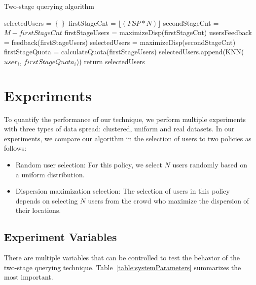 \documentclass{acm_proc_article-sp}
\newcommand\floor[1]{\lfloor#1\rfloor}
\begin{document}
\begin{algorithm}
\caption{Two-stage querying algorithm}
\label{TSalgorithm}
  \begin{algorithmic}[1]
          \State selectedUsers = $\left\{\right\}$
          \State firstStageCnt = $\floor{(FSP*N)}$
          \State secondStageCnt = $M - firstStageCnt$
          \State firstStageUsers = maximizeDisp(firstStageCnt)
          \State usersFeedback = feedback(firstStageUsers)
                 \State selectedUsers = maximizeDisp(secondStageCnt){}
          \Else
          \EndIf  
        \State firstStageQuota = calculateQuota(firstStageUsers)
      \State selectedUsers.append(KNN($user_i$, $firstStageQuota_i$))
    \EndFor
\State return {selectedUsers}
\EndFunction
\end{algorithmic}
\end{algorithm}

\newpage
\section{Experiments}
To quantify the performance of our technique, we perform multiple experiments with three types of data spread: clustered, uniform and real datasets. In our experiments, we compare our algorithm in the selection of users to two policies as follows:
\begin{itemize}
\item Random user selection: For this policy, we select $N$ users randomly based on a uniform distribution.
\item Dispersion maximization selection: The selection of users in this policy depends on selecting $N$ users from the crowd who maximize the dispersion of their locations.
\end{itemize}
\subsection{Experiment Variables}
There are multiple variables that can be controlled to test the behavior of the two-stage querying technique. Table~\ref{table:systemParameters} summarizes the most important.
\end{document}
